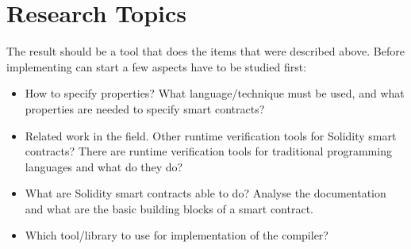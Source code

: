 \documentclass[a4paper]{article}
\begin{document}
\section{Research Topics}
The result should be a tool that does the items that were described above. Before implementing can start a few aspects have to be studied first:
\begin{itemize}
\item How to specify properties? What language/technique must be used, and what properties are needed to specify smart contracts?
\item Related work in the field. Other runtime verification tools for Solidity smart contracts? There are runtime verification tools for traditional programming languages and what do they do?
\item What are Solidity smart contracts able to do? Analyse the documentation and what are the basic building blocks of a smart contract.
\item Which tool/library to use for implementation of the compiler?
\end{itemize}
\end{document}
